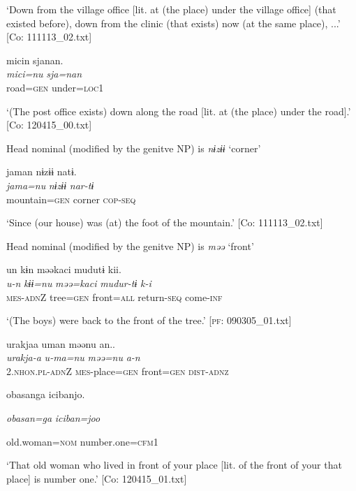 \glt ‘Down from the village office [lit. at (the place) under the village office] (that existed before), down from the clinic (that exists) now (at the same place), ...’ [Co: 111113\_02.txt]
\z

 \ex {\TM}  micin  sjanan.\\
\gll \textit{mici=nu}  \textit{sja=nan}\\

      road=\textsc{gen}  under=\textsc{loc}1

\glt ‘(The post office exists) down along the road [lit. at (the place) under the road].’ [Co: 120415\_00.txt]
\z

  Head nominal (modified by the genitve NP) is \textit{nɨzɨɨ} ‘corner’

 \ex {\TM}  jaman  nɨzɨɨ  natɨ.\\
\gll \textit{jama=nu}  \textit{nɨzɨɨ}  \textit{nar-tɨ}\\

      mountain=\textsc{gen}  corner  \textsc{cop}-\textsc{seq}

\glt ‘Since (our house) was (at) the foot of the mountain.’ [Co: 111113\_02.txt]
\z

  Head nominal (modified by the genitve NP) is \textit{məə} ‘front’

 \ex {\TM}  un  kɨn  məəkaci  mudutɨ  kii.\\
\gll \textit{u-n}  \textit{kɨɨ=nu}  \textit{məə=kaci}  \textit{mudur-tɨ}  \textit{k-i}\\

      \textsc{mes}-\textsc{adn}Z  tree=\textsc{gen}  front=\textsc{all}  return-\textsc{seq}  come-\textsc{inf}

\glt ‘(The boys) were back to the front of the tree.’ [\textsc{pf}: 090305\_01.txt]
\z

 \ex {\TM}  urakjaa  uman  məənu  an..\\
\gll \textit{urakja-a}  \textit{u-ma=nu}  \textit{məə=nu}  \textit{a-n}\\

      2.\textsc{nhon}.\textsc{pl}-\textsc{adn}Z  \textsc{mes}-place=\textsc{gen}  front=\textsc{gen}  \textsc{dist}-\textsc{adnz}

      {\textbar}obasan{\textbar}ga  {\textbar}iciban{\textbar}jo.

      \textit{obasan=ga}  \textit{iciban=joo}

      old.woman=\textsc{nom}  number.one=\textsc{cfm}1

\glt ‘That old woman who lived in front of your place [lit. of the front of your that place] is number one.’ [Co: 120415\_01.txt]
\z

